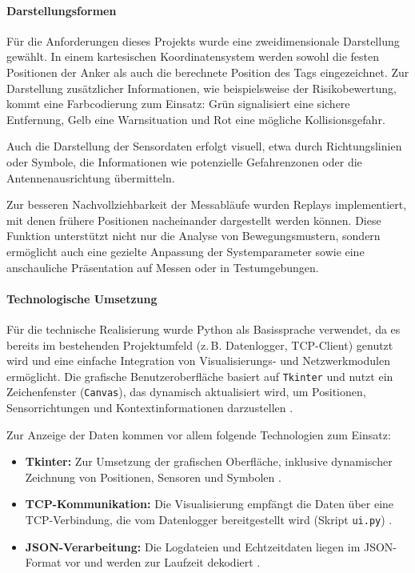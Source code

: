 \documentclass[a4paper, 12pt]{article} %
\begin{document}
\paragraph{Darstellungsformen}

Für die Anforderungen dieses Projekts wurde eine zweidimensionale Darstellung gewählt. In einem kartesischen Koordinatensystem werden sowohl 
die festen Positionen der Anker als auch die berechnete Position des Tags eingezeichnet. Zur Darstellung zusätzlicher Informationen, 
wie beispielsweise der Risikobewertung, kommt eine Farbcodierung zum Einsatz: Grün signalisiert eine sichere Entfernung, Gelb eine 
Warnsituation und Rot eine mögliche Kollisionsgefahr.

Auch die Darstellung der Sensordaten erfolgt visuell, etwa durch Richtungslinien oder Symbole, die Informationen wie potenzielle 
Gefahrenzonen oder die Antennenausrichtung übermitteln.

Zur besseren Nachvollziehbarkeit der Messabläufe wurden Replays implementiert, mit denen frühere Positionen nacheinander dargestellt 
werden können. Diese Funktion unterstützt nicht nur die Analyse von Bewegungsmustern, sondern ermöglicht auch eine gezielte Anpassung 
der Systemparameter sowie eine anschauliche Präsentation auf Messen oder in Testumgebungen.

\paragraph{Technologische Umsetzung}

Für die technische Realisierung wurde Python als Basissprache verwendet, da es bereits im bestehenden Projektumfeld (z.\,B. Datenlogger, \ac{TCP}-Client)
genutzt wird und eine einfache Integration von Visualisierungs- und Netzwerkmodulen ermöglicht. Die grafische Benutzeroberfläche basiert auf \texttt{Tkinter}
und nutzt ein Zeichenfenster (\texttt{Canvas}), das dynamisch aktualisiert wird, um Positionen, Sensorrichtungen und Kontextinformationen darzustellen \cite{tkinter_book}.

Zur Anzeige der Daten kommen vor allem folgende Technologien zum Einsatz:

\begin{itemize}
    \item \textbf{Tkinter:} Zur Umsetzung der grafischen Oberfläche, inklusive dynamischer Zeichnung von Positionen, Sensoren und Symbolen \cite{tkinter_book}.
    \item \textbf{TCP-Kommunikation:} Die Visualisierung empfängt die Daten über eine \ac{TCP}-Verbindung, die vom Datenlogger bereitgestellt wird (Skript \texttt{ui.py}) \cite{tcp_json_integration}.
    \item \textbf{JSON-Verarbeitung:} Die Logdateien und Echtzeitdaten liegen im \ac{JSON}-Format vor und werden zur Laufzeit dekodiert \cite{json_processing_books}.
\end{itemize}
\end{document}
